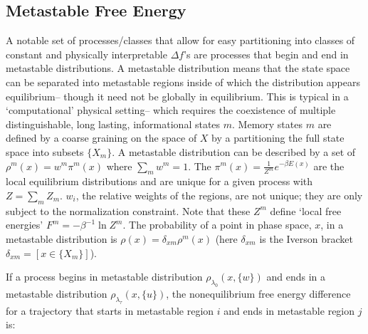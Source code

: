 \documentclass[paper=a4, fontsize=10pt]{article} %
\numberwithin{equation}{section} %
\numberwithin{figure}{section} %
\numberwithin{table}{section} %
\begin{document}
\subsection{Metastable Free Energy}
A notable set of processes/classes that allow for easy partitioning into classes of constant and physically interpretable $\Delta f$'s are processes that begin and end in metastable distributions. A metastable distribution means that the state space can be separated into metastable regions inside of which the distribution appears equilibrium-- though it need not be globally in equilibrium. This is typical in a `computational' physical setting-- which requires the coexistence of multiple distinguishable, long lasting, informational states $m$. Memory states $m$ are defined by a coarse graining on the space of $X$ by a partitioning the full state space into subsets $\{X_m\}$. A metastable distribution can be described by a set of  $\rho^m (x) = w^m \pi^m (x)$ where $\sum_m w^m =1$. The $\pi^m(x) = \frac{1}{Z^m} e^{-\beta E(x)} $ are the local equilibrium distributions and are unique for a given process with $Z = \sum_m Z_m$. $w_i$, the relative weights of the regions, are not unique; they are only subject to the normalization constraint. Note that these $Z^m$ define `local free energies' $F^m = -\beta^{-1} \ln Z^m$. The probability of a point in phase space, $x$, in a metastable distribution is $\rho(x) = \delta_{xm} \rho^m(x)$ (here $\delta_{xm}$ is the Iverson bracket $\delta_{xm} = \left[ x \in\{X_m\} \right]$). 

If a process begins in metastable distribution $\rho_{\lambda_0}(x, \{w\})$ and ends in a metastable distribution $\rho_{\lambda_\tau}(x, \{u\})$, the nonequilibrium free energy difference for a trajectory that starts in metastable region $i$ and ends in metastable region $j$ is:
\end{document}
